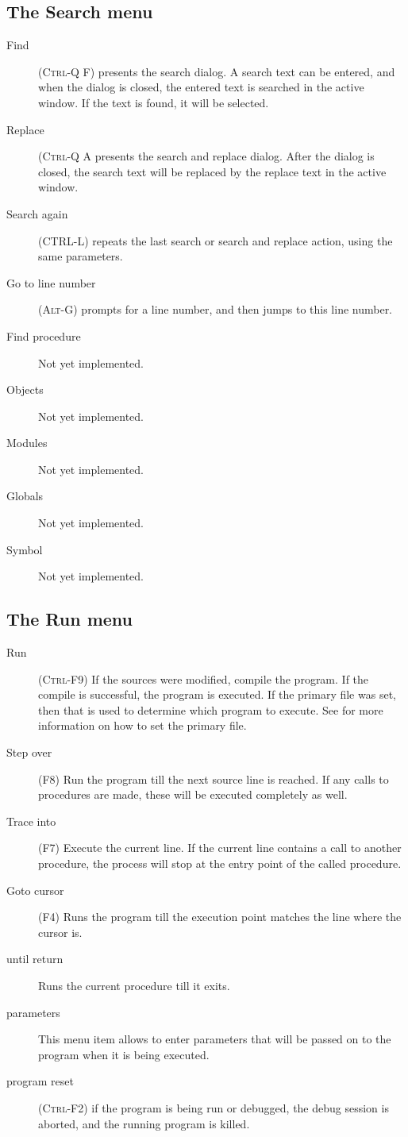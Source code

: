 \subsection{The Search menu}
\label{se:menusearch}
\begin{description}
\item[Find] (\textsc{Ctrl-Q F}) presents the search dialog. A search text 
can be entered, and when the dialog is closed, the entered text is searched
in the active window. If the text is found, it will be selected. 
\item[Replace] (\textsc{Ctrl-Q A} presents the search and replace dialog.
After the dialog is closed, the search text will be replaced by the replace
text in the active window.
\item[Search again] (\textsc{CTRL-L}) repeats the last search or search and replace action,
 using  the same parameters.
\item[Go to line number] (\textsc{Alt-G}) prompts for a line number, and
then jumps to this line number.
\item[Find procedure]
Not yet implemented.
\item[Objects]
Not yet implemented.
\item[Modules]
Not yet implemented.
\item[Globals]
Not yet implemented.
\item[Symbol]
Not yet implemented.
\end{description}
%
%
\subsection{The Run menu}
\label{se:menurun}
\begin{description}
\item[Run] (\textsc{Ctrl-F9})
If the sources were modified, compile the program. If the compile is
successful, the program is executed. If the primary file  was set, then 
that is used to determine which program to execute. See 
for more information on how to set the primary file.
\item[Step over] (\textsc{F8})
Run the program till the next source line is reached. If any calls to 
procedures are made, these will be executed completely as well.
\item[Trace into] (\textsc{F7})
Execute the current line. If the current line contains a call to another
procedure, the process will stop at the entry point of the called procedure.
\item[Goto cursor] (\textsc{F4})
Runs the program till the execution point matches the line where the cursor
is.
\item[until return]
Runs the current procedure till it exits.
\item[parameters]
This menu item allows to enter parameters that will be passed on to the
program when it is being executed.
\item[program reset] (\textsc{Ctrl-F2}) if the program is being run or 
debugged, the debug session is aborted, and the running program is killed.
\end{description}
%
%
